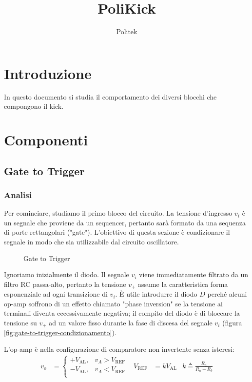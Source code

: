 \documentclass{article}
\title{PoliKick}
\author{Politek}
\newcommand{\var}[2]{#1_\mathrm{#2}}
\theoremstyle{definition}
\begin{document}
\maketitle



\section{Introduzione}
In questo documento si studia il comportamento dei diversi blocchi che compongono il kick.

\section{Componenti}

\subsection{Gate to Trigger}

\subsubsection{Analisi}
Per cominciare, studiamo il primo blocco del circuito.
La tensione d'ingresso \(v_i\) è un segnale che proviene da un sequencer, pertanto sarà formato da una sequenza di porte rettangolari ("gate").
L'obiettivo di questa sezione è condizionare il segnale in modo che sia utilizzabile dal circuito oscillatore.

\begin{figure}[ht]
    \centering
    
    \label{fig:gate-to-trigger}
    \caption{Gate to Trigger}
\end{figure}

Ignoriamo inizialmente il diodo. Il segnale \(v_i\) viene immediatamente filtrato da un filtro RC passa-alto, pertanto la tensione \(v_+\) assume la caratteristica forma esponenziale ad ogni transizione di \(v_i\).
È utile introdurre il diodo \(D\) perché alcuni op-amp soffrono di un effetto chiamato "phase inversion" se la tensione ai terminali diventa eccessivamente negativa; il compito del diodo è di bloccare la tensione su \(v_+\) ad un valore fisso durante la fase di discesa del segnale \(v_i\) (figura \ref{fig:gate-to-trigger-condizionamento}).

L'op-amp è nella configurazione di comparatore non invertente senza isteresi:
\begin{align*}
    v_o &= \begin{cases}
        +\var{V}{AL}, & v_A > \var{V}{REF} \\
        -\var{V}{AL}, & v_A < \var{V}{REF} \\
    \end{cases}
    &
    \var{V}{REF} &= k \var{V}{AL}
    &
    k \triangleq \frac{R_a}{R_a + R_b}
\end{align*}
\end{document}
